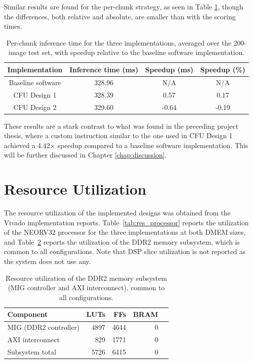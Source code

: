 Similar results are found for the per-chunk strategy, as seen in Table \ref{tab:results_inftotal}, though the differences, both relative and absolute, are smaller than with the scoring times. 

\begin{table}[H]
\centering
\caption{Per-chunk inference time for the three implementations, averaged over the 200-image test set, with speedup relative to the baseline software implementation.}
\label{tab:results_inftotal}
\begin{tabular}{|c|c|c|c|}
\hline
Implementation      & Inference time (ms)    & Speedup (ms)  & Speedup (\%)  \\ \hline
Baseline software   & 328.96                 & N/A           & N/A           \\ \hline
CFU Design 1        & 328.39                 & 0.57          & 0.17          \\ \hline
CFU Design 2        & 329.60                 & -0.64         & -0.19         \\ \hline
\end{tabular}
\end{table}

These results are a stark contrast to what was found in the preceding project thesis, where a custom instruction similar to the one used in CFU Design 1 achieved a 4.42$\times$ speedup compared to a baseline software implementation. This will be further discussed in Chapter \ref{chap:discussion}.


\section{Resource Utilization}
\label{sec:resource_util}

The resource utilization of the implemented designs was obtained from the Vivado implementation reports. Table~\ref{tab:res_processor} reports the utilization of the NEORV32 processor for the three implementations at both DMEM sizes, and Table~\ref{tab:res_subsystem} reports the utilization of the DDR2 memory subsystem, which is common to all configurations. Note that DSP slice utilization is not reported as the system does not use any.



\begin{table}[H]
\centering
\caption{Resource utilization of the DDR2 memory subsystem (MIG controller and
AXI interconnect), common to all configurations.}
\label{tab:res_subsystem}
\begin{tabular}{|l|r|r|r|r|}
\hline
Component               & LUTs & FFs    & BRAM    \\ \hline
MIG (DDR2 controller)   & 4897 & 4644   & 0       \\ \hline
AXI interconnect        & 829  & 1771   & 0       \\ \hline
Subsystem total         & 5726 & 6415   & 0       \\ \hline
\end{tabular}
\end{table}


